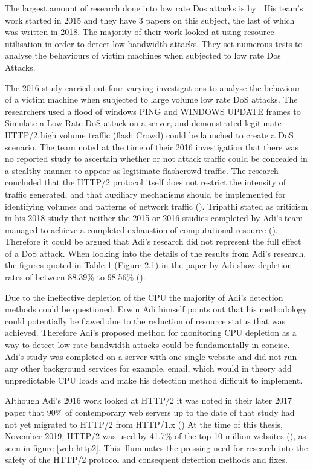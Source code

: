 
The largest amount of research done into low rate Dos attacks is by \citeauthor{Adi2015}. His team's work started in 2015 and they have 3 papers on this subject, the last of which was written in 2018. The majority of their work looked at using resource utilisation in order to detect low bandwidth attacks. They set numerous tests to analyse the behaviours of victim machines when subjected to low rate Dos Attacks. 

The 2016 study carried out four varying investigations to analyse the behaviour of a victim machine when subjected to large volume low rate DoS attacks. The researchers used a flood of windows PING and WINDOWS UPDATE frames to Simulate a Low-Rate DoS attack on a server, and demonstrated legitimate HTTP/2 high volume traffic (flash Crowd) could be launched to create a DoS scenario. The team noted at the time of their 2016 investigation that there was no reported study to ascertain whether or not attack traffic could be concealed in a stealthy manner to appear as legitimate flashcrowd traffic. The research concluded that the HTTP/2 protocol itself does not restrict the intensity of traffic generated, and that auxiliary mechanisms should be implemented for identifying volumes and patterns of network traffic  (\cite{Adi2016}). Tripathi stated as criticism in his 2018 study that neither the 2015 or 2016 studies completed by Adi's team managed to achieve a completed exhaustion of computational resource (\cite{tripathi2018slow}). Therefore it could be argued that Adi's research did not represent the full effect of a DoS attack. When looking into the details of the results from Adi's research, the figures quoted in Table 1 (Figure 2.1) in the paper by Adi show depletion rates of between 88.39\% to 98.56\% (\cite{Adi2016}).

Due to the ineffective depletion of the CPU the majority of Adi's detection methods could be questioned. Erwin Adi himself points out that his methodology could potentially be flawed due to the reduction of resource status that was achieved. Therefore Adi's proposed method for monitoring CPU depletion as a way to detect low rate bandwidth attacks could be fundamentally in-concise. Adi's study was completed on a server with one single website and did not run any other background services for example, email, which would in theory add unpredictable CPU loads and make his detection method difficult to implement.


Although Adi's 2016 work looked at HTTP/2 it was noted in their later 2017 paper that 90\% of contemporary web servers up to the date of that study had not yet migrated to HTTP/2 from HTTP/1.x (\cite{adi2017stealthy}) At the time of this thesis, November 2019, HTTP/2 was used by 41.7\% of the top 10 million websites (\cite{w3techs}), as seen in figure \ref{web http2}. This illuminates the pressing need for research into the safety of the HTTP/2 protocol and consequent detection methods and fixes. 
 
